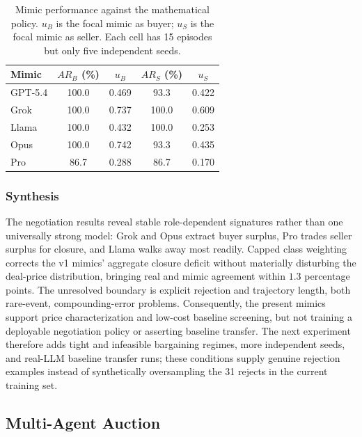 \documentclass[conference]{IEEEtran}
\begin{document}
\begin{table}[htbp]
\caption{Mimic performance against the mathematical policy. $u_B$ is the focal mimic as buyer; $u_S$ is the focal mimic as seller. Each cell has 15 episodes but only five independent seeds.}
\label{tab:neg_baseline}
\centering
\begin{tabular}{lcccc}
\hline
Mimic & $AR_B$ (\%) & $u_B$ & $AR_S$ (\%) & $u_S$ \\
\hline
GPT-5.4 & 100.0 & 0.469 & 93.3 & 0.422 \\
Grok    & 100.0 & 0.737 & 100.0 & 0.609 \\
Llama   & 100.0 & 0.432 & 100.0 & 0.253 \\
Opus    & 100.0 & 0.742 & 93.3 & 0.435 \\
Pro     & 86.7 & 0.288 & 86.7 & 0.170 \\
\hline
\end{tabular}
\end{table}

\subsubsection{Synthesis}

The negotiation results reveal stable role-dependent signatures rather than one universally strong model: Grok and Opus extract buyer surplus, Pro trades seller surplus for closure, and Llama walks away most readily. Capped class weighting corrects the v1 mimics' aggregate closure deficit without materially disturbing the deal-price distribution, bringing real and mimic agreement within $1.3$ percentage points. The unresolved boundary is explicit rejection and trajectory length, both rare-event, compounding-error problems. Consequently, the present mimics support price characterization and low-cost baseline screening, but not training a deployable negotiation policy or asserting baseline transfer. The next experiment therefore adds tight and infeasible bargaining regimes, more independent seeds, and real-LLM baseline transfer runs; these conditions supply genuine rejection examples instead of synthetically oversampling the 31 rejects in the current training set.


\subsection{Multi-Agent Auction}
\end{document}
